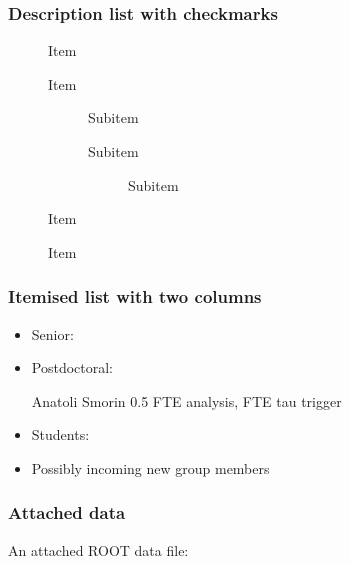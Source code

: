 
\begin{frame}
\frametitle{Description list with checkmarks}
\begin{description}
\item[\Checkmark] Item
\item[\Checkmark] Item
    \begin{description}
    \item[\Checkmark] Subitem
    \item[\textbullet] Subitem
        \begin{description}
        \item[\textbullet] Subitem
        \end{description}
    \end{description}
\item[\Checkmark] Item
\item[\XSolidBrush] Item
\end{description}
\end{frame}

\begin{frame}
\frametitle{Itemised list with two columns}
\begin{itemize}
\item Senior:
    \begin{itemize}
    \end{itemize}
\item Postdoctoral:
    \begin{itemize}
    \twocolumnitem
        {Anatoli Smorin}
        {0.5 FTE analysis, FTE tau trigger}
    \end{itemize}
\item Students:
    \begin{itemize}
    \end{itemize}
\item Possibly incoming new group members
\end{itemize}
\end{frame}

\begin{frame}
\frametitle{Attached data}
\begin{center}
An attached ROOT data file:\\
\mbox{}\\
\\
\end{center}
\end{frame}

